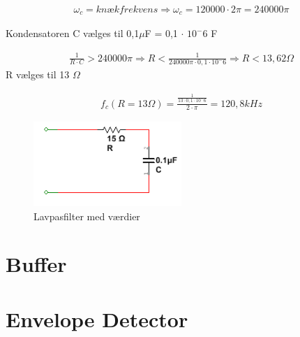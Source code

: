 \begin{align}
	\omega_c = knækfrekvens \Rightarrow \omega_c = 120000 \cdot 2 \pi = 240000\pi 
\end{align} 

Kondensatoren C vælges til 0,1$\mu$F  = 0,1 $\cdot$  $10^-6$ F

\begin{align}
	\frac{1}{R \cdot C} > 240000\pi \Rightarrow R < \frac{1}{240000\pi \cdot 0,1 \cdot 10^-6}
	\Rightarrow R < 13,62 \Omega
\end{align}
	R vælges til 13 $\Omega$
	
\begin{align}
	f_c (R=13\Omega) = \frac{\frac{1}{13 \cdot 0,1 \cdot 10^-6}}{2 \cdot \pi} =120,8kHz
\end{align}	
	
	
\begin{figure}[htbp]
	\centering
	\includegraphics[width=0.50\textwidth]{billeder/HWdesign/LP_MV.png}
	\caption{Lavpasfilter med værdier}
	\label{fig:LP_MV}
\end{figure}

\section{Buffer}

\section{Envelope Detector}
